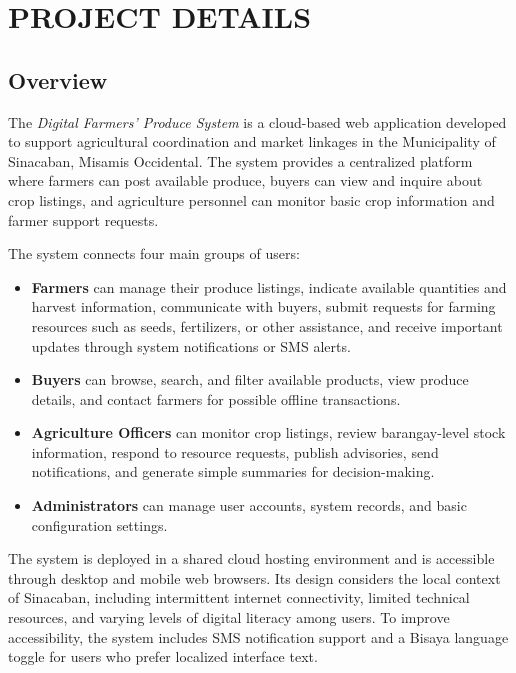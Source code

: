 
\section{PROJECT DETAILS}

\subsection{Overview}

The \textit{Digital Farmers' Produce System} is a cloud-based web application developed to support agricultural coordination and market linkages in the Municipality of Sinacaban, Misamis Occidental. The system provides a centralized platform where farmers can post available produce, buyers can view and inquire about crop listings, and agriculture personnel can monitor basic crop information and farmer support requests.

The system connects four main groups of users:

\begin{itemize}
    \item \textbf{Farmers} can manage their produce listings, indicate available quantities and harvest information, communicate with buyers, submit requests for farming resources such as seeds, fertilizers, or other assistance, and receive important updates through system notifications or SMS alerts.
    
    \item \textbf{Buyers} can browse, search, and filter available products, view produce details, and contact farmers for possible offline transactions.
    
    \item \textbf{Agriculture Officers} can monitor crop listings, review barangay-level stock information, respond to resource requests, publish advisories, send notifications, and generate simple summaries for decision-making.
    
    \item \textbf{Administrators} can manage user accounts, system records, and basic configuration settings.
\end{itemize}

The system is deployed in a shared cloud hosting environment and is accessible through desktop and mobile web browsers. Its design considers the local context of Sinacaban, including intermittent internet connectivity, limited technical resources, and varying levels of digital literacy among users. To improve accessibility, the system includes SMS notification support and a Bisaya language toggle for users who prefer localized interface text.

